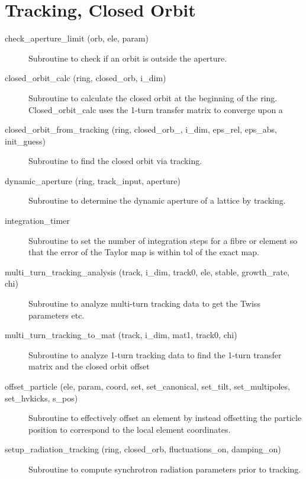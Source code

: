 \section{Tracking, Closed Orbit}
\label{r:track}    

\begin{description}

\item[check\_aperture\_limit (orb, ele, param)] \Newline
Subroutine to check if an orbit is outside the aperture. 

\item[closed\_orbit\_calc (ring, closed\_orb, i\_dim)] \Newline 
     Subroutine to calculate the closed orbit at the beginning of the ring.
     Closed\_orbit\_calc uses the 1-turn transfer matrix to converge upon a  

\item[closed\_orbit\_from\_tracking (ring, closed\_orb\_, i\_dim, eps\_rel, eps\_abs, init\_guess)] \Newline
Subroutine to find the closed orbit via tracking. 

\item[dynamic\_aperture (ring, track\_input, aperture)] \Newline
Subroutine to determine the dynamic aperture of a lattice by tracking. 

\item[integration\_timer] \Newline 
Subroutine to set the number of integration steps for a fibre or element
so that the error of the Taylor map is within tol of the exact map.

\item[multi\_turn\_tracking\_analysis (track, i\_dim, track0, ele, stable, growth\_rate, chi)] \Newline
Subroutine to analyze multi-turn tracking data to get the Twiss parameters etc. 

\item[multi\_turn\_tracking\_to\_mat (track, i\_dim, mat1, track0, chi)] \Newline
Subroutine to analyze 1-turn tracking data to find the 1-turn transfer matrix and the closed orbit offset 

\item[offset\_particle (ele, param, coord, set, set\_canonical, set\_tilt, set\_multipoles, set\_hvkicks, s\_pos)] \Newline
Subroutine to effectively offset an element by instead offsetting the particle position to correspond to the local element coordinates. 

\item[setup\_radiation\_tracking (ring, closed\_orb, fluctuations\_on, damping\_on)] \Newline
Subroutine to compute synchrotron radiation parameters prior to tracking. 


\end{description}
